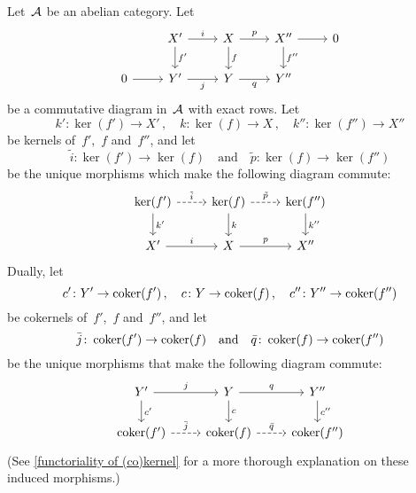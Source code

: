\begin{lemma}
  Let~$\mathcal{A}$ be an abelian category.
  Let
  \begin{equation}
    \label{presnake}
    \begin{tikzcd}
        {}
      & X'
        \arrow{r}[above]{i}
        \arrow{d}[right]{f'}
      & X
        \arrow{r}[above]{p}
        \arrow{d}[right]{f}
      & X''
        \arrow{d}[right]{f''}
        \arrow{r}
      & 0
      \\
        0
        \arrow{r}
      & Y'
        \arrow{r}[below]{j}
      & Y
        \arrow{r}[below]{q}
      & Y''
      & {}
    \end{tikzcd}
  \end{equation}
  be a commutative diagram in~$\mathcal{A}$ with exact rows.
  Let
  \[
    k' \colon \ker(f') \to X' \,,
    \quad
    k \colon \ker(f) \to X \,,
    \quad
    k'' \colon \ker(f'') \to X''
  \]
  be kernels of~$f'$,~$f$ and~$f''$, and let
  \[
    \tilde{i} \colon \ker(f') \to \ker(f)
    \quad\text{and}\quad
    \tilde{p} \colon \ker(f) \to \ker(f'')
  \]
  be the unique morphisms which make the following diagram commute:
  \[
    \begin{tikzcd}
        \ker(f')
        \arrow[dashed]{r}[above]{\tilde{i}}
        \arrow{d}[right]{k'}
      & \ker(f)
        \arrow[dashed]{r}[above]{\tilde{p}}
        \arrow{d}[right]{k}
      & \ker(f'')
        \arrow{d}[right]{k''}
      \\
        X'
        \arrow{r}[above]{i}
      & X
        \arrow{r}[above]{p}
      & X''
    \end{tikzcd}
  \]
  Dually, let
  \[
    c' \colon Y' \to \operatorname{coker}(f') \,,
    \quad
    c \colon Y \to \operatorname{coker}(f) \,,
    \quad
    c'' \colon Y'' \to \operatorname{coker}(f'')
  \]
  be cokernels of~$f'$,~$f$ and~$f''$, and let
  \[
    \bar{j} \colon \operatorname{coker}(f') \to \operatorname{coker}(f)
    \quad\text{and}\quad
    \bar{q} \colon \operatorname{coker}(f) \to \operatorname{coker}(f'')
  \]
  be the unique morphisms that make the following diagram commute:
  \[
    \begin{tikzcd}
        Y'
        \arrow{r}[above]{j}
        \arrow{d}[right]{c'}
      & Y
        \arrow{r}[above]{q}
        \arrow{d}[right]{c}
      & Y''
        \arrow{d}[right]{c''}
      \\
        \coker(f')
        \arrow[dashed]{r}[above]{\bar{j}}
      & \coker(f)
        \arrow[dashed]{r}[above]{\bar{q}}
      & \coker(f'')
    \end{tikzcd}
  \]
  (See \cref{functoriality of (co)kernel} for a more thorough explanation on these induced morphisms.)


\end{lemma}
